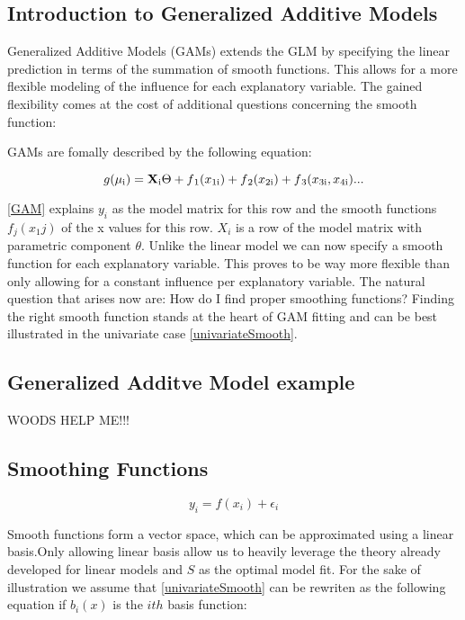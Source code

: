 \documentclass{article}
\begin{document}
    \subsection{Introduction to Generalized Additive Models}
    Generalized Additive Models (GAMs) extends the GLM by specifying the linear prediction in terms of the summation of smooth functions. This allows for a more flexible modeling of the influence for each explanatory variable. The gained flexibility comes at the cost of additional questions concerning the smooth function:

    GAMs are fomally described by the following equation:

    \begin{equation} \label{GAM} g(\mu\textsubscript{i}) = \mathbf{X} \textsubscript{i} \Theta + f\textsubscript{1}(x\textsubscript{1i}) + f\textsubscript{2}(x\textsubscript{2i}) + f\textsubscript{3}(x\textsubscript{3i}, x\textsubscript{4i}) ... \end{equation}

    \ref{GAM} explains $y_i$ as the model matrix for this row and the smooth functions $f_j(x_1j)$ of the x values for this row. $X_i$ is a row of the model matrix with parametric component $\theta$. Unlike the linear model we can now  specify a smooth function for each explanatory variable. This proves to be way more flexible than only allowing for a constant influence per explanatory variable. The natural question that arises now are: How do I find proper smoothing functions? Finding the right smooth function stands at the heart of GAM fitting and can be best illustrated in the univariate case \ref{univariateSmooth}.

    \subsection{Generalized Additve Model example}
    WOODS HELP ME!!!
    \subsection{Smoothing Functions}
     \begin{equation} \label{univariateSmooth} y_i = f(x_i) + \epsilon_i \end{equation}

     Smooth functions form a vector space, which can be approximated using a linear basis.Only allowing linear basis allow us to heavily leverage the theory already developed for linear models and $S$ as the optimal model fit. For the sake of illustration we assume that \ref{univariateSmooth} can be rewriten as the following equation if $b_i(x)$ is the $ith$ basis function:
\end{document}
